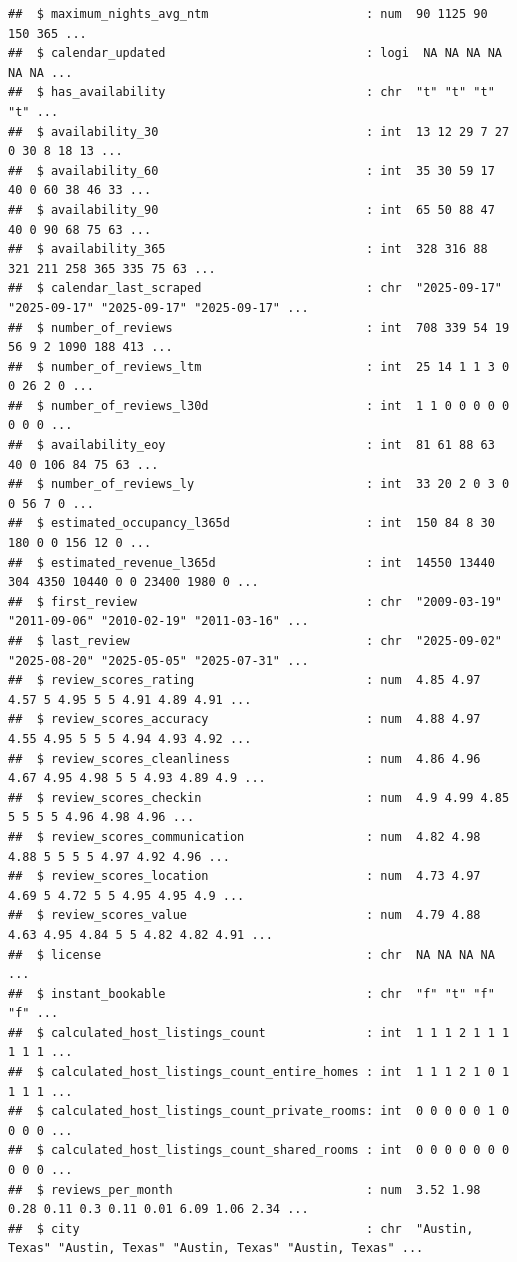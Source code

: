 \documentclass[
]{article}
\begin{document}
\begin{verbatim}
##  $ maximum_nights_avg_ntm                      : num  90 1125 90 150 365 ...
##  $ calendar_updated                            : logi  NA NA NA NA NA NA ...
##  $ has_availability                            : chr  "t" "t" "t" "t" ...
##  $ availability_30                             : int  13 12 29 7 27 0 30 8 18 13 ...
##  $ availability_60                             : int  35 30 59 17 40 0 60 38 46 33 ...
##  $ availability_90                             : int  65 50 88 47 40 0 90 68 75 63 ...
##  $ availability_365                            : int  328 316 88 321 211 258 365 335 75 63 ...
##  $ calendar_last_scraped                       : chr  "2025-09-17" "2025-09-17" "2025-09-17" "2025-09-17" ...
##  $ number_of_reviews                           : int  708 339 54 19 56 9 2 1090 188 413 ...
##  $ number_of_reviews_ltm                       : int  25 14 1 1 3 0 0 26 2 0 ...
##  $ number_of_reviews_l30d                      : int  1 1 0 0 0 0 0 0 0 0 ...
##  $ availability_eoy                            : int  81 61 88 63 40 0 106 84 75 63 ...
##  $ number_of_reviews_ly                        : int  33 20 2 0 3 0 0 56 7 0 ...
##  $ estimated_occupancy_l365d                   : int  150 84 8 30 180 0 0 156 12 0 ...
##  $ estimated_revenue_l365d                     : int  14550 13440 304 4350 10440 0 0 23400 1980 0 ...
##  $ first_review                                : chr  "2009-03-19" "2011-09-06" "2010-02-19" "2011-03-16" ...
##  $ last_review                                 : chr  "2025-09-02" "2025-08-20" "2025-05-05" "2025-07-31" ...
##  $ review_scores_rating                        : num  4.85 4.97 4.57 5 4.95 5 5 4.91 4.89 4.91 ...
##  $ review_scores_accuracy                      : num  4.88 4.97 4.55 4.95 5 5 5 4.94 4.93 4.92 ...
##  $ review_scores_cleanliness                   : num  4.86 4.96 4.67 4.95 4.98 5 5 4.93 4.89 4.9 ...
##  $ review_scores_checkin                       : num  4.9 4.99 4.85 5 5 5 5 4.96 4.98 4.96 ...
##  $ review_scores_communication                 : num  4.82 4.98 4.88 5 5 5 5 4.97 4.92 4.96 ...
##  $ review_scores_location                      : num  4.73 4.97 4.69 5 4.72 5 5 4.95 4.95 4.9 ...
##  $ review_scores_value                         : num  4.79 4.88 4.63 4.95 4.84 5 5 4.82 4.82 4.91 ...
##  $ license                                     : chr  NA NA NA NA ...
##  $ instant_bookable                            : chr  "f" "t" "f" "f" ...
##  $ calculated_host_listings_count              : int  1 1 1 2 1 1 1 1 1 1 ...
##  $ calculated_host_listings_count_entire_homes : int  1 1 1 2 1 0 1 1 1 1 ...
##  $ calculated_host_listings_count_private_rooms: int  0 0 0 0 0 1 0 0 0 0 ...
##  $ calculated_host_listings_count_shared_rooms : int  0 0 0 0 0 0 0 0 0 0 ...
##  $ reviews_per_month                           : num  3.52 1.98 0.28 0.11 0.3 0.11 0.01 6.09 1.06 2.34 ...
##  $ city                                        : chr  "Austin, Texas" "Austin, Texas" "Austin, Texas" "Austin, Texas" ...
\end{verbatim}
\end{document}
